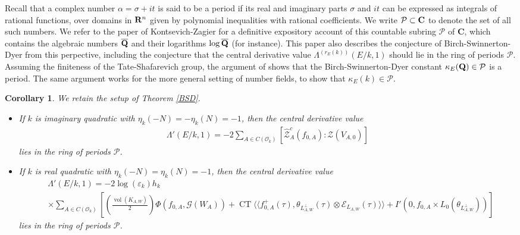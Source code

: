 \documentclass{amsart}
\newtheorem{corollary}[theorem]{Corollary}
\theoremstyle{definition}
\theoremstyle{definition}
\theoremstyle{definition}
\begin{document}
Recall that a complex number $\alpha = \sigma + it$ is said to be a period if its real and imaginary parts $\sigma$ and $it$
can be expressed as integrals of rational functions, over domains in ${\bf{R}}^n$ given by polynomial inequalities with rational 
coefficients. We write $\mathcal{P} \subset {\bf{C}}$ to denote the set of all such numbers.
We refer to the paper of Kontsevich-Zagier \cite{KZ} for a definitive expository account of this countable subring 
$\mathcal{P}$ of {\bf{C}}, which contains the algebraic numbers $\overline{{\bf{Q}}}$ and their logarithms 
$\log \overline{\bf{Q}}$ (for instance). This paper also describes the conjecture of Birch-Swinnerton-Dyer from
this perpective, including the conjecture \cite[Question 4]{KZ} that the central derivative value 
$\Lambda^{(r_E(k))}(E/k, 1)$ should lie in the ring of periods $\mathcal{P}$. 
Assuming the finiteness of the Tate-Shafarevich group, the argument of \cite[$\S 3.5$]{KZ}
shows that the Birch-Swinnerton-Dyer constant $\kappa_E({\bf{Q}}) \in \mathcal{P}$ is a period.
The same argument works for the more general setting of number fields, to show that $\kappa_E(k) \in \mathcal{P}$.

\begin{corollary}\label{periods} We retain the setup of Theorem \ref{BSD}. \\

\begin{itemize}

\item[(i)] If $k$ is imaginary quadratic with $\eta_k(-N) = -\eta_k(N) = -1$, then the central derivative value
\begin{align*} \Lambda'(E/k, 1) %
= -2 \sum\limits_{A \in C(\mathcal{O}_k)} \left[ \widehat{\mathcal{Z}}_A^c(f_{0, A}): \mathcal{Z}(V_{A,0})\right] \end{align*}
lies in the ring of periods $\mathcal{P}$. \\

\item[(ii)] If $k$ is real quadratic with $\eta_k(-N) = \eta_k(N) = -1$, then the central derivative value 
\begin{align*} &\Lambda'(E/k, 1) =-2 \log(\varepsilon_k) h_k  \\ &\times\sum\limits_{A \in C(\mathcal{O}_k)} 
\left[ \left( \frac{ \operatorname{vol}(K_{A,W}) }{2 } \right) \Phi(f_{0, A}, \mathcal{G}(W_A)) 
+ \operatorname{CT} \langle \langle f_{0, A}^+(\tau), \theta_{L_{A, W}^{\perp}}(\tau) \otimes \mathcal{E}_{L_{A, W}}(\tau) \rangle \rangle
+ I'(0, f_{0,A} \times L_0(\theta_{L_{A,W}^{\perp}})) \right] \end{align*}
lies in the ring of periods $\mathcal{P}$.

\end{itemize}

\end{corollary}
\end{document}
